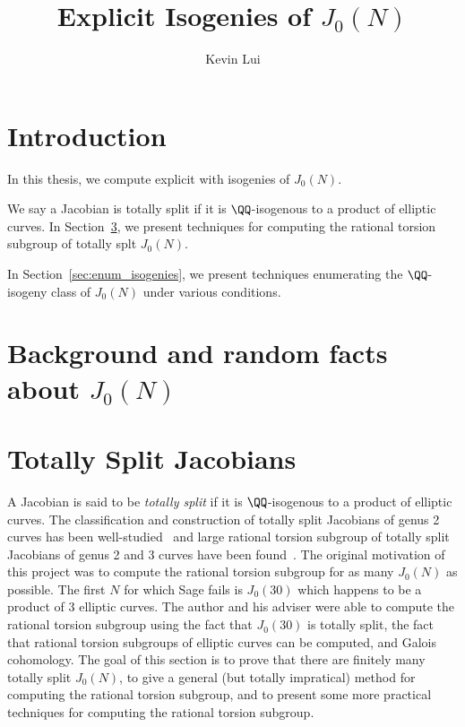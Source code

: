 \documentclass{article}
\author{Kevin Lui}
\title{Explicit Isogenies of $J_0(N)$}
\begin{document}
 
\maketitle
\tableofcontents 
\listoftables

\newpage
\section{Introduction}%
\label{sec:intro}


In this thesis, we compute explicit with isogenies of $J_0(N)$. 

We say a Jacobian is totally split if it is $\QQ$-isogenous to a product of
elliptic curves. In Section~\ref{sec:totally_split}, we present techniques for
computing the rational torsion subgroup of totally splt $J_0(N)$.

In Section~\ref{sec:enum_isogenies}, we present techniques enumerating the
$\QQ$-isogeny class of $J_0(N)$ under various conditions.


\section{Background and random facts about $J_0(N)$}%
\label{sec:back}

\section{Totally Split Jacobians}%
\label{sec:totally_split}

A Jacobian is said to be \emph{totally split} if it is $\QQ$-isogenous to a
product of elliptic curves. The classification and construction of totally
split Jacobians of genus 2 curves has been
well-studied~\cite{bruin-doerksen:split_genus_two,kuhn:split_genus_two}
and large rational torsion subgroup of totally split Jacobians of genus 2 and 3
curves have been found~\cite{howe-leprevost-poonen:large}. The original
motivation of this project was to compute the rational torsion subgroup for as
many $J_0(N)$ as possible. The first $N$ for which Sage fails is $J_0(30)$
which happens to be a product of 3 elliptic curves. The author and his adviser
were able to compute the rational torsion subgroup using the fact that
$J_0(30)$ is totally split, the fact that rational torsion subgroups of
elliptic curves can be computed, and Galois cohomology. The goal of this
section is to prove that there are finitely many totally split $J_0(N)$, to
give a general (but totally impratical) method for computing the rational
torsion subgroup, and to present some more practical techniques for computing
the rational torsion subgroup. 
\end{document}
